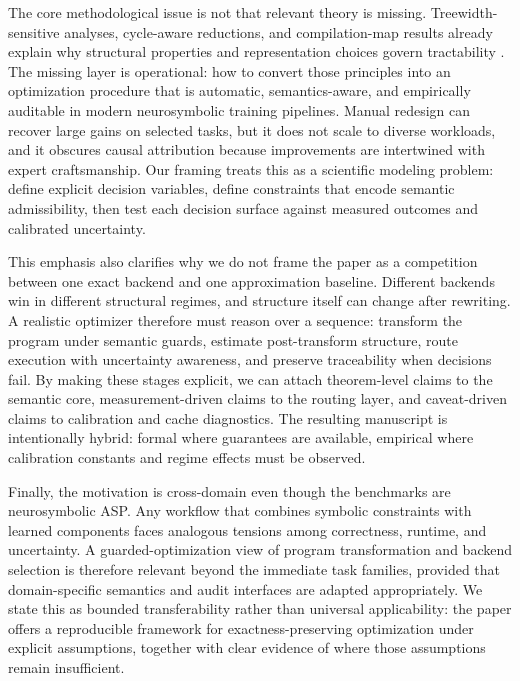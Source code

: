 \documentclass{article} %
\begin{document}
The core methodological issue is not that relevant theory is missing. Treewidth-sensitive analyses, cycle-aware reductions, and compilation-map results already explain why structural properties and representation choices govern tractability \citep{src_001,src_002,src_003,src_045,src_046,src_047,src_048}. The missing layer is operational: how to convert those principles into an optimization procedure that is automatic, semantics-aware, and empirically auditable in modern neurosymbolic training pipelines. Manual redesign can recover large gains on selected tasks, but it does not scale to diverse workloads, and it obscures causal attribution because improvements are intertwined with expert craftsmanship. Our framing treats this as a scientific modeling problem: define explicit decision variables, define constraints that encode semantic admissibility, then test each decision surface against measured outcomes and calibrated uncertainty.

This emphasis also clarifies why we do not frame the paper as a competition between one exact backend and one approximation baseline. Different backends win in different structural regimes, and structure itself can change after rewriting. A realistic optimizer therefore must reason over a sequence: transform the program under semantic guards, estimate post-transform structure, route execution with uncertainty awareness, and preserve traceability when decisions fail. By making these stages explicit, we can attach theorem-level claims to the semantic core, measurement-driven claims to the routing layer, and caveat-driven claims to calibration and cache diagnostics. The resulting manuscript is intentionally hybrid: formal where guarantees are available, empirical where calibration constants and regime effects must be observed.

Finally, the motivation is cross-domain even though the benchmarks are neurosymbolic ASP. Any workflow that combines symbolic constraints with learned components faces analogous tensions among correctness, runtime, and uncertainty. A guarded-optimization view of program transformation and backend selection is therefore relevant beyond the immediate task families, provided that domain-specific semantics and audit interfaces are adapted appropriately. We state this as bounded transferability rather than universal applicability: the paper offers a reproducible framework for exactness-preserving optimization under explicit assumptions, together with clear evidence of where those assumptions remain insufficient.
\end{document}
